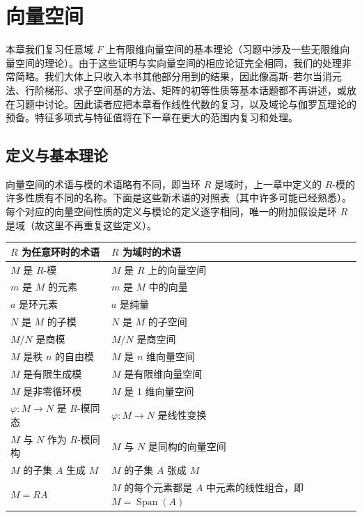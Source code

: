 
\setcounter{chapter}{10}

\chapter{向量空间}

本章我们复习任意域 \(F\) 上有限维向量空间的基本理论（习题中涉及一些无限维向量空间的理论）。由于这些证明与实向量空间的相应论证完全相同，我们的处理非常简略。我们大体上只收入本书其他部分用到的结果，因此像高斯--若尔当消元法、行阶梯形、求子空间基的方法、矩阵的初等性质等基本话题都不再讲述，或放在习题中讨论。因此读者应把本章看作线性代数的复习，以及域论与伽罗瓦理论的预备。特征多项式与特征值将在下一章在更大的范围内复习和处理。

\section{定义与基本理论}

向量空间的术语与模的术语略有不同，即当环 \(R\) 是域时，上一章中定义的 \(R\)-模的许多性质有不同的名称。下面是这些新术语的对照表（其中许多可能已经熟悉）。每个对应的向量空间性质的定义与模论的定义逐字相同，唯一的附加假设是环 \(R\) 是域（故这里不再重复这些定义）。

\begin{center}
\begin{tabular}{ll}
\textbf{\(R\) 为任意环时的术语} & \textbf{\(R\) 为域时的术语} \\
\hline
\(M\) 是 \(R\)-模 & \(M\) 是 \(R\) 上的向量空间 \\
\(m\) 是 \(M\) 的元素 & \(m\) 是 \(M\) 中的向量 \\
\(a\) 是环元素 & \(a\) 是纯量 \\
\(N\) 是 \(M\) 的子模 & \(N\) 是 \(M\) 的子空间 \\
\(M/N\) 是商模 & \(M/N\) 是商空间 \\
\(M\) 是秩 \(n\) 的自由模 & \(M\) 是 \(n\) 维向量空间 \\
\(M\) 是有限生成模 & \(M\) 是有限维向量空间 \\
\(M\) 是非零循环模 & \(M\) 是 1 维向量空间 \\
\(\varphi : M \to N\) 是 \(R\)-模同态 & \(\varphi : M \to N\) 是线性变换 \\
\(M\) 与 \(N\) 作为 \(R\)-模同构 & \(M\) 与 \(N\) 是同构的向量空间 \\
\(M\) 的子集 \(A\) 生成 \(M\) & \(M\) 的子集 \(A\) 张成 \(M\) \\
\(M = RA\) & \(M\) 的每个元素都是 \(A\) 中元素的线性组合，即 \(M = \operatorname{Span}(A)\)
\end{tabular}
\end{center}

